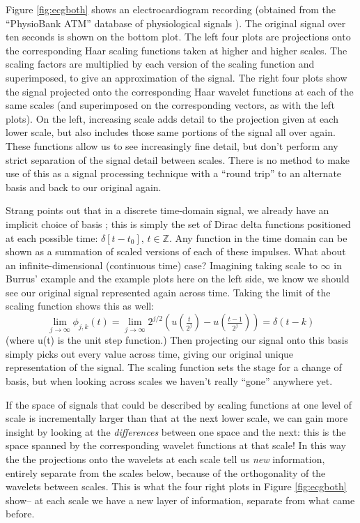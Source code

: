 \documentclass[letterpaper]{article}
\begin{document}
Figure \ref{fig:ecgboth} shows an electrocardiogram recording (obtained from the ``PhysioBank ATM'' database of physiological signals \cite{physionet}).
The original signal over ten seconds is shown on the bottom plot.
The left four plots are projections onto the corresponding Haar scaling functions taken at higher and higher scales.
The scaling factors are multiplied by each version of the scaling function and superimposed, to give an approximation of the signal.
The right four plots show the signal projected onto the corresponding Haar wavelet functions at each of the same scales
(and superimposed on the corresponding vectors, as with the left plots).
On the left, increasing scale adds detail to the projection given at each lower scale, but also includes those same portions of the signal all over again.
These functions allow us to see increasingly fine detail, but don't perform any strict separation of the signal detail between scales. 
There is no method to make use of this as a signal processing technique with a ``round trip'' to an alternate basis and back to our original again.

Strang points out that in a discrete time-domain signal, we already have an implicit choice of basis \cite{strangwavelets};
this is simply the set of Dirac delta functions positioned at each possible time: \( \delta[t-t_0],\, t \in \mathbb{Z} \).
Any function in the time domain can be shown as a summation of scaled versions of each of these impulses.
What about an infinite-dimensional (continuous time) case?
Imagining taking scale to \( \infty \) in Burrus' example and the example plots here on the left side,
we know we should see our original signal represented again across time.
Taking the limit of the scaling function shows this as well:
\[ \lim_{j \to \infty} \phi_{j,k}(t) = \lim_{j \to \infty} 2^{j/2} (u(\tfrac{t}{2^j})-u(\tfrac{t-1}{2^j})) = \delta(t-k) \]
(where u(t) is the unit step function.)
Then projecting our signal onto this basis simply picks out every value across time, giving our original unique representation of the signal.
The scaling function sets the stage for a change of basis, but when looking across scales we haven't really ``gone'' anywhere yet.

If the space of signals that could be described by scaling functions at one level of scale is incrementally larger than that at the next lower scale,
we can gain more insight by looking at the \emph{differences} between one space and the next:
this is the space spanned by the corresponding wavelet functions at that scale!
In this way the the projections onto the wavelets at each scale tell us \emph{new} information,
entirely separate from the scales below,
because of the orthogonality of the wavelets between scales.
This is what the four right plots in Figure \ref{fig:ecgboth} show-- at each scale we have a new layer of information,
separate from what came before.
\end{document}
